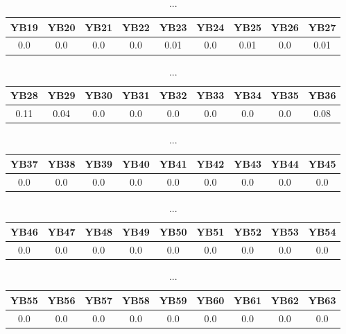 \documentclass[]{article}
\begin{document}
\begin{table}[h]
      \centering
      \begin{tabular}{|c|c|c|c|c|c|c|c|c|}
            \hline
            YB19 & YB20 & YB21 & YB22 & YB23 & YB24 & YB25 & YB26 & YB27 \\
            \hline
            0.0  & 0.0  & 0.0  & 0.0  & 0.01 & 0.0  & 0.01 & 0.0  & 0.01 \\
            \hline
      \end{tabular}
      \caption{...}
\end{table}
\begin{table}[h]
      \centering
      \begin{tabular}{|c|c|c|c|c|c|c|c|c|}
            \hline
            YB28 & YB29 & YB30 & YB31 & YB32 & YB33 & YB34 & YB35 & YB36 \\
            \hline
            0.11 & 0.04 & 0.0  & 0.0  & 0.0  & 0.0  & 0.0  & 0.0  & 0.08 \\
            \hline
      \end{tabular}
      \caption{...}
\end{table}
\begin{table}[h]
      \centering
      \begin{tabular}{|c|c|c|c|c|c|c|c|c|}
            \hline
            YB37 & YB38 & YB39 & YB40 & YB41 & YB42 & YB43 & YB44 & YB45 \\
            \hline
            0.0  & 0.0  & 0.0  & 0.0  & 0.0  & 0.0  & 0.0  & 0.0  & 0.0  \\
            \hline
      \end{tabular}
      \caption{...}
\end{table}
\begin{table}[h]
      \centering
      \begin{tabular}{|c|c|c|c|c|c|c|c|c|}
            \hline
            YB46 & YB47 & YB48 & YB49 & YB50 & YB51 & YB52 & YB53 & YB54 \\
            \hline
            0.0  & 0.0  & 0.0  & 0.0  & 0.0  & 0.0  & 0.0  & 0.0  & 0.0  \\
            \hline
      \end{tabular}
      \caption{...}
\end{table}
\begin{table}[h]
      \centering
      \begin{tabular}{|c|c|c|c|c|c|c|c|c|}
            \hline
            YB55 & YB56 & YB57 & YB58 & YB59 & YB60 & YB61 & YB62 & YB63 \\
            \hline
            0.0  & 0.0  & 0.0  & 0.0  & 0.0  & 0.0  & 0.0  & 0.0  & 0.0  \\
            \hline
      \end{tabular}
      \caption{...}
\end{table}
\end{document}
